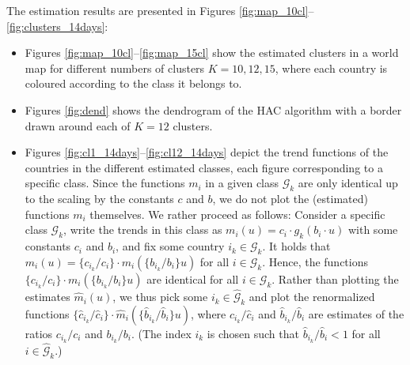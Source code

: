 \documentclass[a4paper,12pt]{article}
\numberwithin{equation}{section}
\begin{document}
The estimation results are presented in Figures \ref{fig:map_10cl}--\ref{fig:clusters_14days}:
\begin{itemize}[leftmargin=0.6cm]
\item Figures \ref{fig:map_10cl}--\ref{fig:map_15cl} show the estimated clusters in a world map for different numbers of clusters $K =10, 12, 15$, where each country is coloured according to the class it belongs to. 
\item Figures \ref{fig:dend} shows the dendrogram of the HAC algorithm with a border drawn around each of $K = 12$ clusters.
\item Figures \ref{fig:cl1_14days}--\ref{fig:cl12_14days} depict the trend functions of the countries in the different estimated classes, each figure corresponding to a specific class. Since the functions $m_i$ in a given class $\mathcal{G}_k$ are only identical up to the scaling by the constants $c$ and $b$, we do not plot the (estimated) functions $m_i$ themselves. We rather proceed as follows: Consider a specific class $\mathcal{G}_k$,  write the trends in this class as $m_i(u) = c_i \cdot g_k(b_i \cdot u)$ with some constants $c_i$ and $b_i$, and fix some country $i_k \in \mathcal{G}_k$. It holds that $m_i(u) = \{ c_{i_k}/c_i \} \cdot m_i(\{ b_{i_k}/b_i \} u)$ for all $i \in \mathcal{G}_k$. Hence, the functions $\{ c_{i_k}/c_i \} \cdot m_i(\{ b_{i_k}/b_i \} u)$ are identical for all $i \in \mathcal{G}_k$. Rather than plotting the estimates $\hat{m}_i(u)$, we thus pick some $i_k \in \hat{\mathcal{G}}_k$ and plot the renormalized functions $\{ \hat{c}_{i_k}/\hat{c}_i \} \cdot \hat{m}_i(\{ \hat{b}_{i_k}/\hat{b}_i \} u)$, where $\hat{c}_{i_k}/\hat{c}_i$ and $\hat{b}_{i_k}/\hat{b}_i$ are estimates of the ratios $c_{i_k}/c_i$ and $b_{i_k}/b_i$. (The index $i_k$ is chosen such that $\hat{b}_{i_k}/\hat{b}_i < 1$ for all $i \in \hat{\mathcal{G}}_k$.)
\end{itemize}

\end{document}

